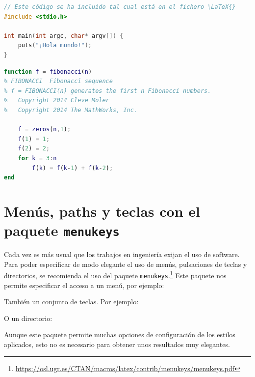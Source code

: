 \begin{lstlisting}[style=ruled,language=C,caption={Ejemplo de código fuente en lenguaje C},label=lst:codC]
// Este código se ha incluido tal cual está en el fichero \LaTeX{}
#include <stdio.h>

int main(int argc, char* argv[]) {
	puts("¡Hola mundo!");
}
\end{lstlisting}


\begin{lstlisting}[style=ruled,language=Matlab,caption={Ejemplo de script en Matlab},label=lst:matlab]
function f = fibonacci(n)
% FIBONACCI  Fibonacci sequence
% f = FIBONACCI(n) generates the first n Fibonacci numbers.
%   Copyright 2014 Cleve Moler
% 	Copyright 2014 The MathWorks, Inc.

	f = zeros(n,1); 
	f(1) = 1;
	f(2) = 2;
	for k = 3:n
		f(k) = f(k-1) + f(k-2);
end
\end{lstlisting}



\section{Menús, paths y teclas con el paquete \texttt{menukeys}}
Cada vez es más usual que los trabajos en ingeniería exijan el uso de 
software. Para poder especificar de modo elegante el uso de menús, pulsaciones de teclas y directorios, se recomienda el uso del paquete 
\texttt{menukeys}.\footnote{\url{https://osl.ugr.es/CTAN/macros/latex/contrib/menukeys/menukeys.pdf}}
  Este paquete nos permite especificar el acceso a un menú, por 
ejemplo:

\noindent {}

\noindent También un conjunto de teclas. Por ejemplo:

\noindent O un directorio:

\noindent Aunque este paquete permite muchas opciones de configuración de los estilos aplicados, esto no es necesario para obtener unos resultados muy elegantes.










